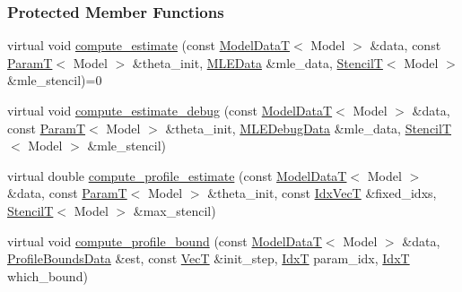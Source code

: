 \subsubsection*{Protected Member Functions}
\begin{DoxyCompactItemize}
\item 
virtual void \hyperlink{classmappel_1_1estimator_1_1Estimator_ac0ea02d936ebc25149d521c37665bfa6}{compute\+\_\+estimate} (const \hyperlink{namespacemappel_a97f050df953605381ae9c901c3b125f1}{Model\+DataT}$<$ Model $>$ \&data, const \hyperlink{namespacemappel_a667925cb0d6c0e49f2f035cc5a9a6857}{ParamT}$<$ Model $>$ \&theta\+\_\+init, \hyperlink{namespacemappel_1_1estimator_structmappel_1_1estimator_1_1MLEData}{M\+L\+E\+Data} \&mle\+\_\+data, \hyperlink{namespacemappel_a3a06598240007876f8c4bf834ad86197}{StencilT}$<$ Model $>$ \&mle\+\_\+stencil)=0
\item 
virtual void \hyperlink{classmappel_1_1estimator_1_1Estimator_a59710205cc6b04fe84b171d9bc4b5d1c}{compute\+\_\+estimate\+\_\+debug} (const \hyperlink{namespacemappel_a97f050df953605381ae9c901c3b125f1}{Model\+DataT}$<$ Model $>$ \&data, const \hyperlink{namespacemappel_a667925cb0d6c0e49f2f035cc5a9a6857}{ParamT}$<$ Model $>$ \&theta\+\_\+init, \hyperlink{structmappel_1_1estimator_1_1MLEDebugData}{M\+L\+E\+Debug\+Data} \&mle\+\_\+data, \hyperlink{namespacemappel_a3a06598240007876f8c4bf834ad86197}{StencilT}$<$ Model $>$ \&mle\+\_\+stencil)
\item 
virtual double \hyperlink{classmappel_1_1estimator_1_1Estimator_a99486218b65fb20baa8af8234fc9f10a}{compute\+\_\+profile\+\_\+estimate} (const \hyperlink{namespacemappel_a97f050df953605381ae9c901c3b125f1}{Model\+DataT}$<$ Model $>$ \&data, const \hyperlink{namespacemappel_a667925cb0d6c0e49f2f035cc5a9a6857}{ParamT}$<$ Model $>$ \&theta\+\_\+init, const \hyperlink{namespacemappel_ac63743dcd42180127307cd0e4ecdd784}{Idx\+VecT} \&fixed\+\_\+idxs, \hyperlink{namespacemappel_a3a06598240007876f8c4bf834ad86197}{StencilT}$<$ Model $>$ \&max\+\_\+stencil)
\item 
virtual void \hyperlink{classmappel_1_1estimator_1_1Estimator_a83f877d399368dee1f10cc905d833a85}{compute\+\_\+profile\+\_\+bound} (const \hyperlink{namespacemappel_a97f050df953605381ae9c901c3b125f1}{Model\+DataT}$<$ Model $>$ \&data, \hyperlink{structmappel_1_1estimator_1_1ProfileBoundsData}{Profile\+Bounds\+Data} \&est, const \hyperlink{namespacemappel_a2225ad69f358daa3f4f99282a35b9a3a}{VecT} \&init\+\_\+step, \hyperlink{namespacemappel_ab17ec0f30b61ece292439d7ece81d3a8}{IdxT} param\+\_\+idx, \hyperlink{namespacemappel_ab17ec0f30b61ece292439d7ece81d3a8}{IdxT} which\+\_\+bound)

\end{DoxyCompactItemize}
